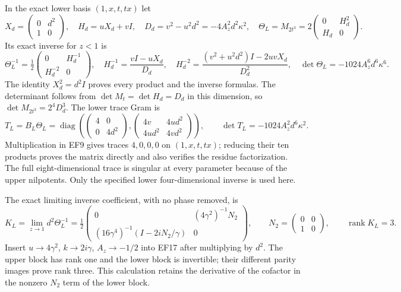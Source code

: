 \documentclass[11pt]{article}
\begin{document}
In the exact lower basis $(1,x,t,tx)$ let
\begin{equation}
 X_d=\begin{pmatrix}0&d^2\\1&0\end{pmatrix},\quad
 H_d=uX_d+vI,\quad D_d=v^2-u^2d^2=-4A_z^2d^2\kappa^2,\quad
 \Theta_L=M_{2t^3}=2\begin{pmatrix}0&H_d^2\\H_d&0\end{pmatrix}.
 \tag{EF16}
\end{equation}
Its exact inverse for $z<1$ is
\begin{equation}
 \Theta_L^{-1}=\tfrac12\begin{pmatrix}0&H_d^{-1}\\H_d^{-2}&0\end{pmatrix},\quad
 H_d^{-1}=\frac{vI-uX_d}{D_d},\quad
 H_d^{-2}=\frac{(v^2+u^2d^2)I-2uvX_d}{D_d^2},\quad
 \det\Theta_L=-1024A_z^6d^6\kappa^6.
 \tag{EF17}
\end{equation}
The identity $X_d^2=d^2I$ proves every product and the
inverse formulas. The determinant follows from
$\det M_t=\det H_d=D_d$ in this dimension, so
$\det M_{2t^3}=2^4D_d^3$. The lower trace Gram is
\begin{equation}
 T_L=B_L\Theta_L=
 \operatorname{diag}\left(
 \begin{pmatrix}4&0\\0&4d^2\end{pmatrix},
 \begin{pmatrix}4v&4ud^2\\4ud^2&4vd^2\end{pmatrix}\right),
 \qquad\det T_L=-1024A_z^2d^6\kappa^2.
 \tag{EF18}
\end{equation}
Multiplication in EF9 gives traces $4,0,0,0$ on
$(1,x,t,tx)$; reducing their ten products proves the
matrix directly and also verifies the residue factorization.
The full eight-dimensional trace is singular at every
parameter because of the upper nilpotents. Only the
specified lower four-dimensional inverse is used here.

The exact limiting inverse coefficient, with no phase
removed, is
\begin{equation}
 K_L=\lim_{z\to1}d^2\Theta_L^{-1}
  =\tfrac12\begin{pmatrix}
       0&(4\gamma^2)^{-1}N_2\\
       (16\gamma^4)^{-1}(I-2iN_2/\gamma)&0
     \end{pmatrix},\qquad
 N_2=\begin{pmatrix}0&0\\1&0\end{pmatrix},\qquad\operatorname{rank}K_L=3.
 \tag{EF19}
\end{equation}
Insert $u\to4\gamma^2$, $k\to2i\gamma$,
$A_z\to-1/2$ into EF17 after multiplying by $d^2$.
The upper block has rank one and the lower block is
invertible; their different parity images prove rank three.
This calculation retains the derivative of the cofactor
in the nonzero $N_2$ term of the lower block.
\end{document}
